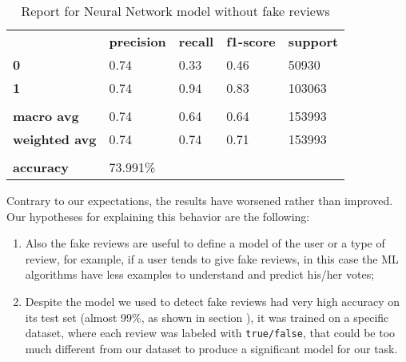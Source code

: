 \begin{table}[h!]
    \centering
    \begin{tabular}{lllll}
        \rowcolor[HTML]{EEEEEE} 
        \cellcolor[HTML]{FBFBFB} & \textbf{precision} & \textbf{recall} & \textbf{f1-score} & \textbf{support} \\
        \rowcolor[HTML]{EEEEEE} 
        \textbf{0}               & 0.74               & 0.33            & 0.46              & 50930            \\
        \rowcolor[HTML]{EEEEEE} 
        \textbf{1}               & 0.74               & 0.94            & 0.83              & 103063           \\
        \rowcolor[HTML]{FBFBFB} 
        &                    &                 &                   &                  \\
        \rowcolor[HTML]{EEEEEE} 
        \textbf{macro avg}       & 0.74               & 0.64            & 0.64              & 153993           \\
        \rowcolor[HTML]{EEEEEE} 
        \textbf{weighted avg}    & 0.74               & 0.74            & 0.71              & 153993           \\
        \rowcolor[HTML]{FBFBFB} 
        &                    &                 &                   &                  \\
        \rowcolor[HTML]{EEEEEE} 
        \textbf{accuracy}        & \multicolumn{4}{l}{\cellcolor[HTML]{EEEEEE}73.991\%}                         
    \end{tabular}
    \caption{Report for Neural Network model without fake reviews}
    \label{tab:nn-res-no-fake}
\end{table}

Contrary to our expectations, the results have worsened rather than improved.\\
Our hypotheses for explaining this behavior are the following:
\begin{enumerate}
    \item Also the fake reviews are useful to define a model of the user or a type of review, for example, if a user tends to give fake reviews, in this case the ML algorithms have less examples to understand and predict his/her votes;
    \item Despite the model we used to detect fake reviews had very high accuracy on its test set (almost 99\%, as shown in section ), it was trained on a specific dataset, where each review was labeled with  \texttt{true/false}, that could be too much different from our dataset to produce a significant model for our task.
\end{enumerate}

